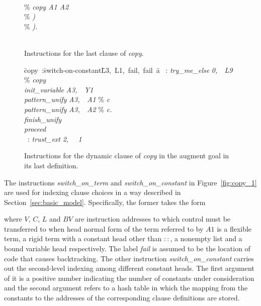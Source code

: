 \begin{figure}
\begin{tabbing}
\>                                      \\
\>                                    \> \%        \>     \>                 \>        \> {\it copy A1 A2}  \\
\>                     \>                        \> \%        \>     \>                 \> {\it )}\\
\>                       \>                        \> \% {\it ).}\\
\>                           \\
\>                  
\end{tabbing}
\caption{Instructions for the last clause of {\it copy}.}\label{fig:copy_2}
\end{figure}

\begin{figure}\footnotesize
\begin{tabbing}
\dquad\=copy\ :\dquad\=switch-on-constant\dquad\=L3,\ L1,\ fail,\ fail\ \dquad\dquad a\= \kill
{}\ : \> {\it try\_me\_else}    \> {\it 0,\ \ L9}   \> \% {\it copy\ }\= \\
\>              \> {\it init\_variable}   \> {\it A3,\ \ Y1}  \\
\>              \> {\it pattern\_unify}   \> {\it A3,\ \ A1}  \> \%             \> {\it c} \\
\>              \> {\it pattern\_unify}   \> {\it A3,\ \ A2}  \> \%             \> {\it c.} \\
\>              \> {\it finish\_unify}    \\
\>              \> {\it proceed}          \\
\ :   \> {\it trust\_ext}       \> {\it 2, \ \ 1}
\end{tabbing}
\caption{Instructions for the dynamic clause of {\it copy} in the augment goal in its last definition.}\label{fig:copy_3}
\end{figure}

The instructions {\it switch\_on\_term} and {\it switch\_on\_constant}
in Figure~\ref{fig:copy_1} are used for indexing clause choices in a way
described in Section~\ref{sec:basic_model}.
Specifically, the former
takes the form
\begin{tabbing}
\end{tabbing}
where $V$, $C$, $L$ and $BV$ are instruction addresses to which control must
be transferred to when head normal form of the term referred to by $A1$
is a flexible term, a rigid term with a constant head other than $::$,
a nonempty list and a bound variable head respectively. The label {\it fail}
is assumed to be the location of code that causes backtracking.
The other instruction {\it switch\_on\_constant} carries out the second-level
indexing among different constant heads. The first argument of it is a positive
number indicating the number of constants under consideration and the second
argument refers to a hash table in which the mapping from the constants to
the addresses of the corresponding clause definitions are stored.

